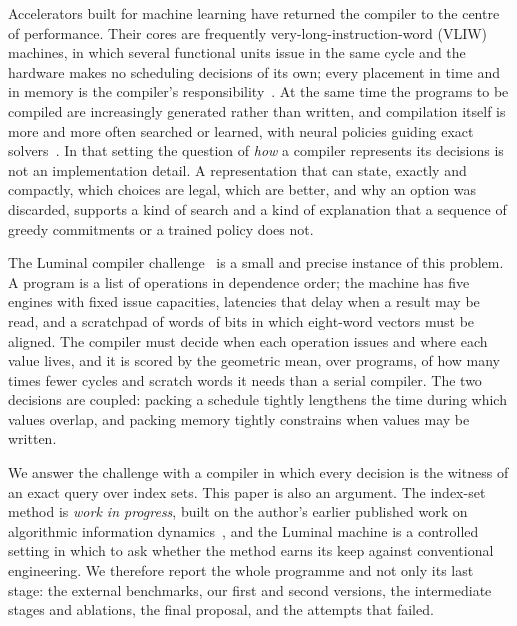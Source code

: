 \documentclass[11pt,a4paper]{article}
\begin{document}
Accelerators built for machine learning have returned the compiler to the
centre of performance. Their cores are frequently very-long-instruction-word
(VLIW) machines, in which several functional units issue in the same cycle and
the hardware makes no scheduling decisions of its own; every placement in time
and in memory is the compiler's responsibility~\cite{fisher1983}. At the same
time the programs to be compiled are increasingly generated rather than written,
and compilation itself is more and more often searched or learned, with neural
policies guiding exact solvers~\cite{gasse2019}. In that setting the question of
\emph{how} a compiler represents its decisions is not an implementation detail.
A representation that can state, exactly and compactly, which choices are legal,
which are better, and why an option was discarded, supports a kind of search and
a kind of explanation that a sequence of greedy commitments or a trained policy
does not.

The Luminal compiler challenge~\cite{luminal} is a small and precise instance of
this problem. A program is a list of operations in dependence order; the machine
has five engines with fixed issue capacities, latencies that delay when a result
may be read, and a scratchpad of  words of  bits in which
eight-word vectors must be aligned. The compiler must decide when each operation
issues and where each value lives, and it is scored by the geometric mean, over
programs, of how many times fewer cycles and scratch words it needs than a serial
compiler. The two decisions are coupled: packing a schedule tightly lengthens the
time during which values overlap, and packing memory tightly constrains when
values may be written.

We answer the challenge with a compiler in which every decision is the witness
of an exact query over index sets. This paper is also an argument. The index-set
method is \emph{work in progress}, built on the author's earlier published work on
algorithmic information dynamics~\cite{hernandez2019aid,hernandez2021aid}, and
the Luminal machine is a controlled setting in which to ask whether the method
earns its keep against conventional engineering. We therefore report the whole
programme and not only its last stage: the external benchmarks, our first and
second versions, the intermediate stages and ablations, the final proposal, and
the attempts that failed.
\end{document}
